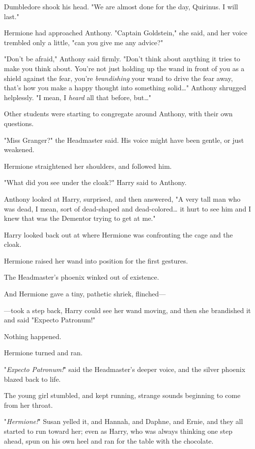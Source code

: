 Dumbledore shook his head. "We are almost done for the day, Quirinus. I will 
last."

Hermione had approached Anthony. "Captain Goldstein," she said, and her voice 
trembled only a little, "can you give me any advice?"

"Don't be afraid," Anthony said firmly. "Don't think about anything it tries to 
make you think about. You're not just holding up the wand in front of you as a 
shield against the fear, you're \emph{brandishing} your wand to drive the fear 
away, that's how you make a happy thought into something solid{\ldots}" Anthony 
shrugged helplessly. "I mean, I \emph{heard} all that before, but{\ldots}"

Other students were starting to congregate around Anthony, with their own 
questions.

"Miss Granger?" the Headmaster said. His voice might have been gentle, or just 
weakened.

Hermione straightened her shoulders, and followed him.

"What did you see under the cloak?" Harry said to Anthony.

Anthony looked at Harry, surprised, and then answered, "A very tall man who was 
dead, I mean, sort of dead-shaped and dead-colored{\ldots} it hurt to see him 
and I knew that was the Dementor trying to get at me."

Harry looked back out at where Hermione was confronting the cage and the cloak.

Hermione raised her wand into position for the first gestures.

The Headmaster's phoenix winked out of existence.

And Hermione gave a tiny, pathetic shriek, flinched---

---took a step back, Harry could see her wand moving, and then she brandished 
it and said "Expecto Patronum!"

Nothing happened.

Hermione turned and ran.

"\emph{Expecto Patronum!}" said the Headmaster's deeper voice, and the silver 
phoenix blazed back to life.

The young girl stumbled, and kept running, strange sounds beginning to come 
from her throat.

"\emph{Hermione!}" Susan yelled it, and Hannah, and Daphne, and Ernie, and they 
all started to run toward her; even as Harry, who was always thinking one step 
ahead, spun on his own heel and ran for the table with the chocolate.

